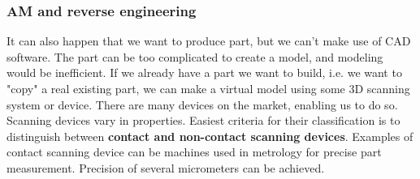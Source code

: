 \documentclass[a4paper, twoside, 11pt]{report}
\begin{document}
\subsubsection{AM and reverse engineering}
It can also happen that we want to produce part, but we can't make use of CAD software. The part can be too complicated to create a model, and modeling would be inefficient. If we already have a part we want to build, i.e. we want to "copy" a real existing part, we can make a virtual model using some 3D scanning system or device. There are many devices on the market, enabling us to do so. Scanning devices vary in properties. Easiest criteria for their classification is to distinguish between \textbf{contact and non-contact scanning devices}. Examples of contact scanning device can be machines used in metrology for precise part measurement. Precision of several micrometers can be achieved.\\
%
\end{document}
